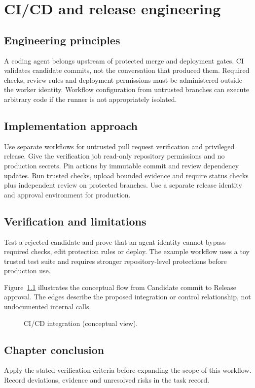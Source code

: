 \chapter{CI/CD and release engineering}

\section{Engineering principles}

A coding agent belongs upstream of protected merge and deployment gates. CI validates candidate commits, not the conversation that produced them. Required checks, review rules and deployment permissions must be administered outside the worker identity. Workflow configuration from untrusted branches can execute arbitrary code if the runner is not appropriately isolated.

\section{Implementation approach}

Use separate workflows for untrusted pull request verification and privileged release. Give the verification job read-only repository permissions and no production secrets. Pin actions by immutable commit and review dependency updates. Run trusted checks, upload bounded evidence and require status checks plus independent review on protected branches. Use a separate release identity and approval environment for production.

\section{Verification and limitations}

Test a rejected candidate and prove that an agent identity cannot bypass required checks, edit protection rules or deploy. The example workflow uses a toy trusted test suite and requires stronger repository-level protections before production use.

Figure~\ref{fig:d18} illustrates the conceptual flow from Candidate commit to Release approval. The edges describe the proposed integration or control relationship, not undocumented internal calls.

\begin{figure}[htbp]\centering\caption{CI/CD integration (conceptual view).}\label{fig:d18}\end{figure}

\section{Chapter conclusion}

Apply the stated verification criteria before expanding the scope of this workflow. Record deviations, evidence and unresolved risks in the task record.
